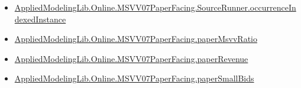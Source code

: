 \documentclass[10pt]{article}
\begin{document}
\begin{itemize}
\item \hyperlink{governing-declaration-15d177ff0033a703}{Applied\allowbreak{}Modeling\allowbreak{}Lib.\allowbreak{}Online.\allowbreak{}MSVV07\allowbreak{}Paper\allowbreak{}Facing.\allowbreak{}Source\allowbreak{}Runner.\allowbreak{}occurrence\allowbreak{}Indexed\allowbreak{}Instance}
\item \hyperlink{governing-declaration-11865634591d1a39}{Applied\allowbreak{}Modeling\allowbreak{}Lib.\allowbreak{}Online.\allowbreak{}MSVV07\allowbreak{}Paper\allowbreak{}Facing.\allowbreak{}paper\allowbreak{}Msvv\allowbreak{}Ratio}
\item \hyperlink{governing-declaration-3d5795d9eda3f090}{Applied\allowbreak{}Modeling\allowbreak{}Lib.\allowbreak{}Online.\allowbreak{}MSVV07\allowbreak{}Paper\allowbreak{}Facing.\allowbreak{}paper\allowbreak{}Revenue}
\item \hyperlink{governing-declaration-486965f4d3a16406}{Applied\allowbreak{}Modeling\allowbreak{}Lib.\allowbreak{}Online.\allowbreak{}MSVV07\allowbreak{}Paper\allowbreak{}Facing.\allowbreak{}paper\allowbreak{}Small\allowbreak{}Bids}
\end{itemize}
\end{document}
